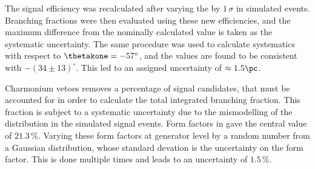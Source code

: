 
The signal efficiency was recalculated after varying the \thetakone by $1\,\sigma$ in simulated
 events.
Branching fractions were then evaluated using these new efficiencies, and the maximum difference
from the nominally calculated value is taken as the systematic uncertainty.
The same procedure was used to calculate systematics with respect to $\thetakone=-57^\circ$, and
the values are found to be consistent with $-(34\pm13)^\circ$.
This led to an assigned uncertainty of $\approx1.5\pc$.

Charmonium vetoes removes a percentage of signal candidates, that must be accounted for in order to
calculate the total integrated branching fraction.
This fraction is subject to a systematic uncertainty due to the mismodelling of the \qsq
distribution in the simulated signal events.
Form factors in  gave the central value of $21.3\,\%$.
Varying these form factors at generator level by a random number from a Gaussian distribution, whose
standard devation is the uncertainty on the form factor.
This is done multiple times and leads to an uncertainty of $1.5\,\%$.










